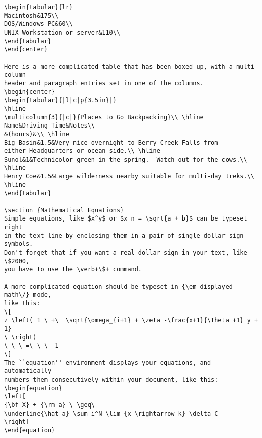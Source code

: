 \begin{verbatim}
\begin{tabular}{lr}
Macintosh&175\\
DOS/Windows PC&60\\
UNIX Workstation or server&110\\
\end{tabular}
\end{center}

Here is a more complicated table that has been boxed up, with a multi-column
header and paragraph entries set in one of the columns.
\begin{center}
\begin{tabular}{|l|c|p{3.5in}|}
\hline
\multicolumn{3}{|c|}{Places to Go Backpacking}\\ \hline
Name&Driving Time&Notes\\
&(hours)&\\ \hline
Big Basin&1.5&Very nice overnight to Berry Creek Falls from
either Headquarters or ocean side.\\ \hline
Sunol&1&Technicolor green in the spring.  Watch out for the cows.\\ \hline
Henry Coe&1.5&Large wilderness nearby suitable for multi-day treks.\\ \hline
\end{tabular}

\section {Mathematical Equations}
Simple equations, like $x^y$ or $x_n = \sqrt{a + b}$ can be typeset right
in the text line by enclosing them in a pair of single dollar sign symbols.
Don't forget that if you want a real dollar sign in your text, like \$2000,
you have to use the \verb+\$+ command.

A more complicated equation should be typeset in {\em displayed math\/} mode,
like this:
\[
z \left( 1 \ +\  \sqrt{\omega_{i+1} + \zeta -\frac{x+1}{\Theta +1} y + 1} 
\ \right)
\ \ \ =\ \ \  1
\]
The ``equation'' environment displays your equations, and automatically
numbers them consecutively within your document, like this:
\begin{equation}
\left[
{\bf X} + {\rm a} \ \geq\ 
\underline{\hat a} \sum_i^N \lim_{x \rightarrow k} \delta C
\right]
\end{equation}


\end{verbatim}
